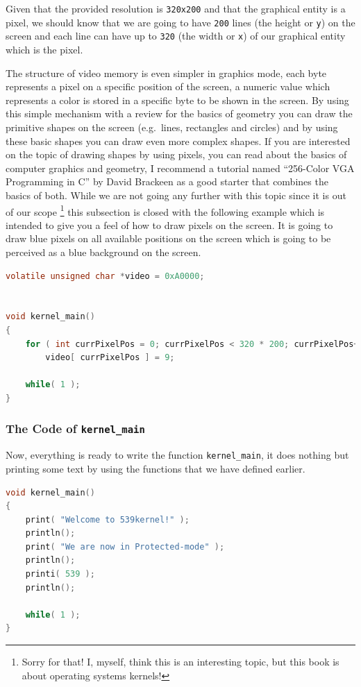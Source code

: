 Given that the provided resolution is \lstinline!320x200! and that the
graphical entity is a pixel, we should know that we are going to have
\lstinline!200! lines (the height or \lstinline!y!) on the screen and
each line can have up to \lstinline!320! (the width or \lstinline!x!) of
our graphical entity which is the pixel.

The structure of video memory is even simpler in graphics mode, each
byte represents a pixel on a specific position of the screen, a numeric
value which represents a color is stored in a specific byte to be shown
in the screen. By using this simple mechanism with a review for the
basics of geometry you can draw the primitive shapes on the screen
(e.g.~lines, rectangles and circles) and by using these basic shapes you
can draw even more complex shapes. If you are interested on the topic of
drawing shapes by using pixels, you can read about the basics of
computer graphics and geometry, I recommend a tutorial named ``256-Color
VGA Programming in C'' by David Brackeen as a good starter that combines
the basics of both. While we are not going any further with this topic
since it is out of our scope \footnote{Sorry for that! I, myself, think
  this is an interesting topic, but this book is about operating systems
  kernels!} this subsection is closed with the following example which
is intended to give you a feel of how to draw pixels on the screen. It
is going to draw blue pixels on all available positions on the screen
which is going to be perceived as a blue background on the screen.

\begin{lstlisting}[language=C]
volatile unsigned char *video = 0xA0000;


void kernel_main()
{
    for ( int currPixelPos = 0; currPixelPos < 320 * 200; currPixelPos++ )
        video[ currPixelPos ] = 9;
    
    while( 1 );
}
\end{lstlisting}

\subsubsection{\texorpdfstring{The Code of
\texttt{kernel\_main}}{The Code of kernel\_main}}\label{the-code-of-kernel_main}

Now, everything is ready to write the function \lstinline!kernel_main!,
it does nothing but printing some text by using the functions that we
have defined earlier.

\begin{lstlisting}[language=C]
void kernel_main()
{
    print( "Welcome to 539kernel!" );
    println();
    print( "We are now in Protected-mode" );
    println();
    printi( 539 );
    println();
    
    while( 1 );
}
\end{lstlisting}

